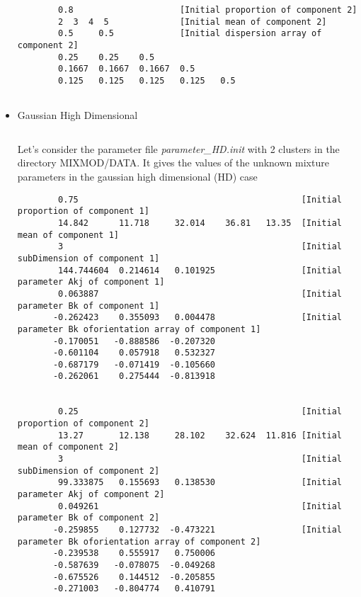 \begin{itemize}
{\begin{verbatim}
        0.8                     [Initial proportion of component 2]
        2  3  4  5              [Initial mean of component 2]
        0.5     0.5             [Initial dispersion array of component 2]
        0.25    0.25    0.5
        0.1667  0.1667  0.1667  0.5
        0.125   0.125   0.125   0.125   0.5


 \end{verbatim}
}

\item Gaussian High Dimensional

$ $

Let's consider the parameter file {\it parameter\_HD.init} with 2 clusters in the directory
MIXMOD/DATA. It gives the values of the unknown mixture parameters in the gaussian high dimensional (HD)
case
{\scriptsize
\begin{verbatim}
        0.75                                            [Initial proportion of component 1]
        14.842      11.718     32.014    36.81   13.35  [Initial mean of component 1]
        3                                               [Initial subDimension of component 1]
        144.744604  0.214614   0.101925                 [Initial parameter Akj of component 1]
        0.063887                                        [Initial parameter Bk of component 1]
       -0.262423    0.355093   0.004478                 [Initial parameter Bk oforientation array of component 1]
       -0.170051   -0.888586  -0.207320
       -0.601104    0.057918   0.532327
       -0.687179   -0.071419  -0.105660
       -0.262061    0.275444  -0.813918


        0.25                                            [Initial proportion of component 2]
        13.27       12.138     28.102    32.624  11.816 [Initial mean of component 2]
        3                                               [Initial subDimension of component 2]
        99.333875   0.155693   0.138530                 [Initial parameter Akj of component 2]
        0.049261                                        [Initial parameter Bk of component 2]
       -0.259855    0.127732  -0.473221                 [Initial parameter Bk oforientation array of component 2]
       -0.239538    0.555917   0.750006
       -0.587639   -0.078075  -0.049268
       -0.675526    0.144512  -0.205855
       -0.271003   -0.804774   0.410791
\end{verbatim}
}


\end{itemize}






